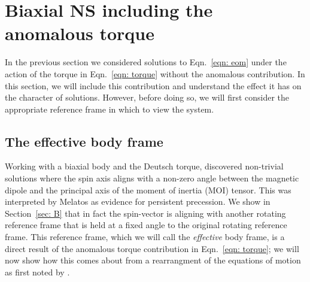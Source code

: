 \documentclass[../full_thesis/full_thesis.tex]{subfiles}
\begin{document}
\FloatBarrier

\section{Biaxial NS including the anomalous torque}
\label{sec: biaxial NS with anomalous torque}
In the previous section we considered solutions to Eqn.~\eqref{eqn: eom}
under the action of the torque in Eqn.~\eqref{eqn: torque} without the
anomalous contribution. In this section, we will include this contribution and
understand the effect it has on the character of solutions. However, before
doing so, we will first consider the appropriate reference frame in which to
view the system.

\subsection{The effective body frame}
\label{sec: effective body frame}
Working with a biaxial body and the Deutsch torque, \cite{Melatos2000}
discovered non-trivial solutions where the spin axis aligns with a non-zero
angle between the magnetic dipole and the principal axis of the moment of
inertia (MOI) tensor.  This was
interpreted by Melatos as evidence for persistent precession. We show in
Section~\ref{sec: B} that in fact the spin-vector is aligning with another
rotating reference frame that is held at a fixed angle to the original rotating
reference frame. This reference frame, which we will call the \emph{effective} body
frame, is a direct result of the anomalous torque contribution in
Eqn.~\eqref{eqn: torque}; we will now show how this comes about from a
rearrangment of the equations of motion as first noted by \citet{Glampedakis2010}.
\end{document}
